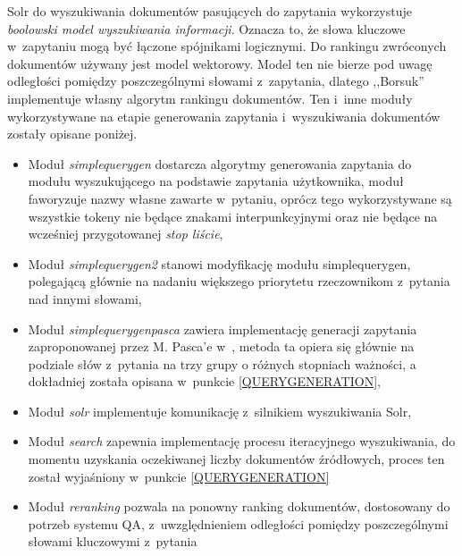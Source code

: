 \documentclass[a4paper, twoside, openright, 12pt]{report}
\begin{document}
            Solr do wyszukiwania dokumentów pasujących do zapytania wykorzystuje \emph{boolowski model wyszukiwania informacji}.
            Oznacza to, że słowa kluczowe w~zapytaniu mogą być łączone spójnikami logicznymi. Do rankingu zwróconych
            dokumentów używany jest model wektorowy. Model ten nie bierze pod uwagę odległości pomiędzy poszczególnymi
            słowami z~zapytania, dlatego ,,Borsuk'' implementuje własny algorytm rankingu dokumentów. Ten i~inne moduły
            wykorzystywane na etapie generowania zapytania i~wyszukiwania dokumentów zostały opisane poniżej.
            \begin{itemize}
                \item Moduł \emph{simplequerygen} dostarcza algorytmy generowania zapytania do modułu wyszukującego
                    na podstawie zapytania użytkownika, moduł faworyzuje nazwy własne zawarte w~pytaniu, oprócz tego
                    wykorzystywane są wszystkie tokeny nie będące znakami interpunkcyjnymi oraz nie będące na wcześniej
                    przygotowanej \emph{stop liście},
                \item Moduł \emph{simplequerygen2} stanowi modyfikację modułu simplequerygen, polegającą głównie na
                    nadaniu większego priorytetu rzeczownikom z~pytania nad innymi słowami,
                \item Moduł \emph{simplequerygenpasca} zawiera implementację generacji zapytania zaproponowanej przez
                    M. Pasca'e w~\cite{PASZKA}, metoda ta opiera się głównie na podziale słów z~pytania na trzy grupy o różnych
                    stopniach ważności, a dokładniej została opisana w~punkcie \ref{QUERYGENERATION},
                \item Moduł \emph{solr} implementuje komunikację z~silnikiem wyszukiwania Solr,
                \item Moduł \emph{search} zapewnia implementację procesu iteracyjnego wyszukiwania, do momentu uzyskania
                    oczekiwanej liczby dokumentów źródłowych, proces ten został wyjaśniony w~punkcie \ref{QUERYGENERATION}
                \item Moduł \emph{reranking} pozwala na ponowny ranking dokumentów, dostosowany do potrzeb systemu QA,
                    z~uwzględnieniem odległości pomiędzy poszczególnymi słowami kluczowymi z~pytania
            \end{itemize}
\end{document}

